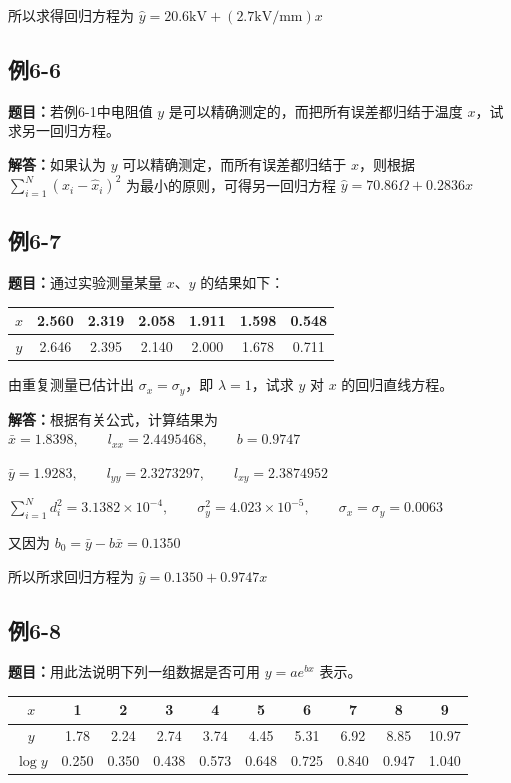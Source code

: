 \documentclass[UTF8,zihao=-4]{ctexart}
\newcommand{\problem}[1]{\subsection*{#1}}
\newcommand{\timu}{\noindent\textbf{题目：}}
\newcommand{\jieda}{\noindent\textbf{解答：}}
\begin{document}
所以求得回归方程为 $\hat{y} = 20.6\mathrm{kV} + (2.7\mathrm{kV}/\mathrm{mm})x$

\problem{例6-6}

\timu 若例6-1中电阻值 $y$ 是可以精确测定的，而把所有误差都归结于温度 $x$，试求另一回归方程。

\jieda 如果认为 $y$ 可以精确测定，而所有误差都归结于 $x$，则根据 $\sum_{i=1}^{N}(x_i-\hat{x}_i)^2$ 为最小的原则，可得另一回归方程 $\hat{y} = 70.86\Omega+0.2836x$

\problem{例6-7}

\timu 通过实验测量某量 $x$、$y$ 的结果如下：

\begin{center}
\small
\setlength{\tabcolsep}{5pt}
\begin{tabular}{c|cccccc}
\toprule
$x$ & 2.560 & 2.319 & 2.058 & 1.911 & 1.598 & 0.548\\
\midrule
$y$ & 2.646 & 2.395 & 2.140 & 2.000 & 1.678 & 0.711\\
\bottomrule
\end{tabular}
\end{center}

由重复测量已估计出 $\sigma_x=\sigma_y$，即 $\lambda=1$，试求 $y$ 对 $x$ 的回归直线方程。

\jieda 根据有关公式，计算结果为 $\bar{x}=1.8398, \qquad l_{xx}=2.4495468, \qquad b=0.9747$

$\bar{y}=1.9283, \qquad l_{yy}=2.3273297, \qquad l_{xy}=2.3874952$

$\sum_{i=1}^{N}d_i^2=3.1382\times10^{-4}, \qquad \sigma_y^2=4.023\times10^{-5}, \qquad \sigma_x=\sigma_y=0.0063$

又因为 $b_0=\bar{y}-b\bar{x}=0.1350$

所以所求回归方程为 $\hat{y}=0.1350+0.9747x$

\problem{例6-8}

\timu 用此法说明下列一组数据是否可用 $y=ae^{bx}$ 表示。

\begin{center}
\small
\setlength{\tabcolsep}{5pt}
\begin{tabular}{c|ccccccccc}
\toprule
$x$ & 1 & 2 & 3 & 4 & 5 & 6 & 7 & 8 & 9\\
\midrule
$y$ & 1.78 & 2.24 & 2.74 & 3.74 & 4.45 & 5.31 & 6.92 & 8.85 & 10.97\\
$\log y$ & 0.250 & 0.350 & 0.438 & 0.573 & 0.648 & 0.725 & 0.840 & 0.947 & 1.040\\
\bottomrule
\end{tabular}
\end{center}
\end{document}
